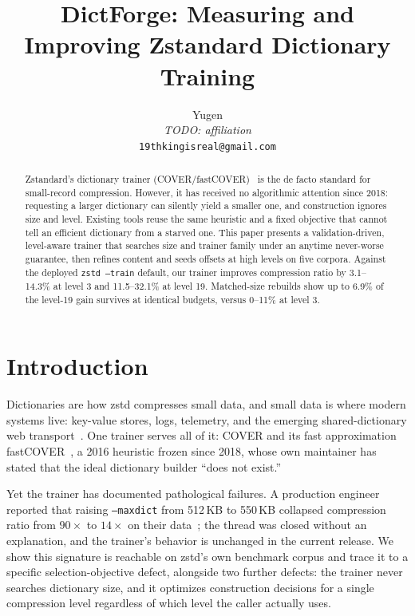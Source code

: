\documentclass[12pt]{article}
\title{DictForge: Measuring and Improving Zstandard Dictionary Training}
\author{
  Yugen \\
  \textit{TODO: affiliation} \\
  \texttt{19thkingisreal@gmail.com}
}
\date{}
\newcommand{\pending}[1]{#1}
\begin{document}
\maketitle

\begin{abstract}
Zstandard's dictionary trainer (COVER/fastCOVER)~\cite{liao2016cover} is
the de facto standard for small-record compression. However, it has
received no algorithmic attention since 2018: requesting a larger
dictionary can silently yield a smaller one, and construction ignores
size and level. Existing tools reuse the same heuristic and a fixed
objective that cannot tell an efficient dictionary from a starved one.
This paper presents a validation-driven, level-aware trainer that
searches size and trainer family under an anytime never-worse
guarantee, then refines content and seeds offsets at high levels on
five corpora. Against the deployed \texttt{zstd
--train} default, our trainer improves compression ratio by
\pending{3.1}--14.3\% at level 3 and 11.5--32.1\% at level 19.
Matched-size rebuilds show up to 6.9\% of the level-19 gain survives at
identical budgets, versus 0--11\% at level 3.
\end{abstract}

\section{Introduction}
\label{sec:introduction}

Dictionaries are how zstd compresses small data, and small data is
where modern systems live: key-value stores, logs, telemetry, and the
emerging shared-dictionary web transport~\cite{rfc9842}. One trainer
serves all of it: COVER and its fast approximation fastCOVER~\cite{liao2016cover},
a 2016 heuristic frozen since 2018, whose own maintainer has stated
that the ideal dictionary builder ``does not exist.''

Yet the trainer has documented pathological failures. A production
engineer reported that raising \texttt{--maxdict} from 512\,KB to
550\,KB collapsed compression ratio from $90\times$ to $14\times$ on
their data~\cite{zstdissue4127}; the thread was closed without an
explanation, and the trainer's behavior is unchanged in the current
release. We show this signature is reachable on zstd's own benchmark
corpus and trace it to a specific selection-objective defect, alongside
two further defects: the trainer never searches dictionary size, and it
optimizes construction decisions for a single compression level
regardless of which level the caller actually uses.
\end{document}
